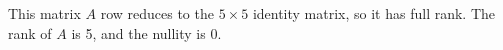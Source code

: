 This matrix $A$ row reduces to the $5\times 5$ identity matrix, so it has full rank.  The rank of $A$ is 5, and the nullity is $0$.
